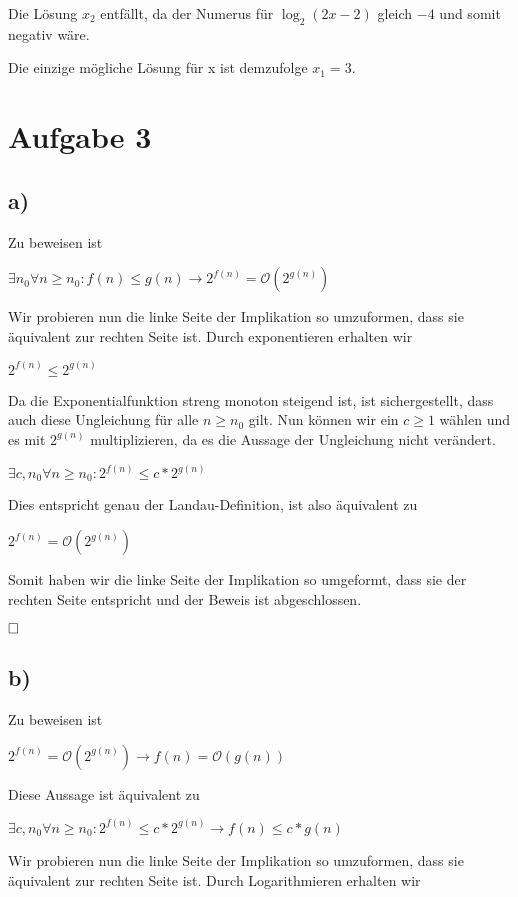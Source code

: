 \documentclass[12pt]{scrartcl}%
\theoremstyle{nonumberplain}
\newcommand{\bO}[1]{\mathcal O(#1)}
\begin{document}
Die Lösung $x_2$ entfällt, da der Numerus für $\log_{2}{(2x-2)}$ gleich $-4$ und somit negativ wäre.

Die einzige mögliche Lösung für x ist demzufolge $x_1 = 3$.

\newpage

\section*{Aufgabe 3}
\subsection*{a)}

Zu beweisen ist

$ \exists n_0 \forall n \ge n_0: f(n) \le g(n) \rightarrow 2^{f(n)} = \bO{2^{g(n)}} $

Wir probieren nun die linke Seite der Implikation so umzuformen, dass sie äquivalent zur rechten Seite ist. Durch exponentieren erhalten wir

$ 2^{f(n)} \le 2^{g(n)} $

Da die Exponentialfunktion streng monoton steigend ist, ist sichergestellt, dass auch diese Ungleichung für alle $n \ge n_0$ gilt. Nun können wir ein $c \ge 1$ wählen und es mit $2^{g(n)}$ multiplizieren, da es die Aussage der Ungleichung nicht verändert.

$ \exists c,n_0 \forall n \ge n_0: 2^{f(n)} \le c * 2^{g(n)} $

Dies entspricht genau der Landau-Definition, ist also äquivalent zu

$ 2^{f(n)} = \bO{2^{g(n)}} $

Somit haben wir die linke Seite der Implikation so umgeformt, dass sie der rechten Seite entspricht und der Beweis ist abgeschlossen.

$\hfill \square$


\subsection*{b)}

Zu beweisen ist

$ 2^{f(n)} = \bO{2^{g(n)}} \rightarrow f(n) = \bO{g(n)} $

Diese Aussage ist äquivalent zu

$ \exists c,n_0 \forall n \ge n_0: 2^{f(n)} \le c * 2^{g(n)} \rightarrow f(n) \le c * g(n) $

Wir probieren nun die linke Seite der Implikation so umzuformen, dass sie äquivalent zur rechten Seite ist. Durch Logarithmieren erhalten wir
\end{document}
